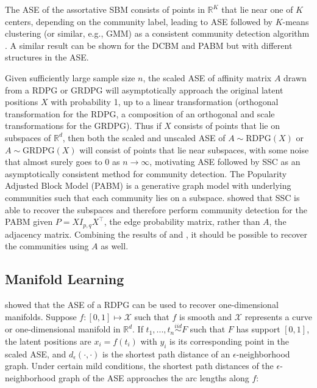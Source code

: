 \documentclass[
  11pt,
]{article}
\begin{document}
The ASE of the assortative SBM consists of points in \(\mathbb{R}^K\)
that lie near one of \(K\) centers, depending on the community label,
leading to ASE followed by \(K\)-means clustering (or similar, e.g.,
GMM) as a consistent community detection algorithm \cite{lyzinski2014}.
A similar result can be shown for the DCBM and PABM but with different
structures in the ASE.

Given sufficiently large sample size \(n\), the scaled ASE of affinity
matrix \(A\) drawn from a RDPG or GRDPG will asymptotically approach the
original latent positions \(X\) with probability 1, up to a linear
transformation (orthogonal transformation for the RDPG, a composition of
an orthogonal and scale transformations for the GRDPG). Thus if \(X\)
consists of points that lie on subspaces of \(\mathbb{R}^d\), then both
the scaled and unscaled ASE of \(A \sim \text{RDPG}(X)\) or
\(A \sim \text{GRDPG}(X)\) will consist of points that lie near
subspaces, with some noise that almost surely goes to \(0\) as
\(n \to \infty\), motivating ASE followed by SSC as an asymptotically
consistent method for community detection. The Popularity Adjusted Block
Model (PABM) \cite{307cbeb9b1be48299388437423d94bf1} is a generative
graph model with underlying communities such that each community lies on
a subspace. \citet{noroozi2019estimation} showed that SSC is able to
recover the subspaces and therefore perform community detection for the
PABM given \(P = X I_{p, q} X^\top\), the edge probability matrix,
rather than \(A\), the adjacency matrix. Combining the results of
\citeauthor{rubindelanchy2017statistical} and
\citeauthor{jmlr-v28-wang13}, it should be possible to recover the
communities using \(A\) as well.

\hypertarget{manifold-learning}{%
\subsection{Manifold Learning}\label{manifold-learning}}

\citet{trosset2020learning} showed that the ASE of a RDPG can be used to
recover one-dimensional manifolds. Suppose
\(f : [0, 1] \mapsto \mathcal{X}\) such that \(f\) is smooth and
\(\mathcal{X}\) represents a curve or one-dimensional manifold in
\(\mathbb{R}^d\). If \(t_1, ..., t_n \stackrel{iid}{\sim} F\) such that
\(F\) has support \([0, 1]\), the latent positions are \(x_i = f(t_i)\)
with \(y_i\) is its corresponding point in the scaled ASE, and
\(d_{\epsilon}(\cdot, \cdot)\) is the shortest path distance of an
\(\epsilon\)-neighborhood graph. Under certain mild conditions, the
shortest path distances of the \(\epsilon\)-neighborhood graph of the
ASE approaches the arc lengths along \(f\):
\end{document}
